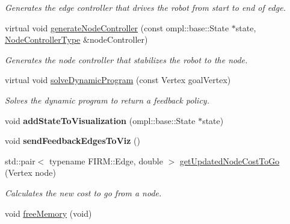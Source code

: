 \begin{DoxyCompactItemize}
\begin{DoxyCompactList}\small\item\em \-Generates the edge controller that drives the robot from start to end of edge. \end{DoxyCompactList}\item 
\hypertarget{class_f_i_r_m_ace29a4cc91f7232235931fa4bded8809}{virtual void \hyperlink{class_f_i_r_m_ace29a4cc91f7232235931fa4bded8809}{generate\-Node\-Controller} (const ompl\-::base\-::\-State $\ast$state, \hyperlink{class_controller}{\-Node\-Controller\-Type} \&node\-Controller)}\label{class_f_i_r_m_ace29a4cc91f7232235931fa4bded8809}

\begin{DoxyCompactList}\small\item\em \-Generates the node controller that stabilizes the robot to the node. \end{DoxyCompactList}\item 
\hypertarget{class_f_i_r_m_afe1c42e65c3382e1089324c1ab6306b6}{virtual void \hyperlink{class_f_i_r_m_afe1c42e65c3382e1089324c1ab6306b6}{solve\-Dynamic\-Program} (const \-Vertex goal\-Vertex)}\label{class_f_i_r_m_afe1c42e65c3382e1089324c1ab6306b6}

\begin{DoxyCompactList}\small\item\em \-Solves the dynamic program to return a feedback policy. \end{DoxyCompactList}\item 
\hypertarget{class_f_i_r_m_a4003d4144f6c32e9eaba79f292ec9ce4}{void {\bfseries add\-State\-To\-Visualization} (ompl\-::base\-::\-State $\ast$state)}\label{class_f_i_r_m_a4003d4144f6c32e9eaba79f292ec9ce4}

\item 
\hypertarget{class_f_i_r_m_a8d9e316c11b1e2ff52b5ff65996d3a01}{void {\bfseries send\-Feedback\-Edges\-To\-Viz} ()}\label{class_f_i_r_m_a8d9e316c11b1e2ff52b5ff65996d3a01}

\item 
\hypertarget{class_f_i_r_m_a63fbfe74dd4ac52c0cb0526ab9cf63bb}{std\-::pair$<$ typename \-F\-I\-R\-M\-::\-Edge, \*
double $>$ \hyperlink{class_f_i_r_m_a63fbfe74dd4ac52c0cb0526ab9cf63bb}{get\-Updated\-Node\-Cost\-To\-Go} (\-Vertex node)}\label{class_f_i_r_m_a63fbfe74dd4ac52c0cb0526ab9cf63bb}

\begin{DoxyCompactList}\small\item\em \-Calculates the new cost to go from a node. \end{DoxyCompactList}\item 
\hypertarget{class_f_i_r_m_af6951ffec04529fd8da990978d7d8d19}{void \hyperlink{class_f_i_r_m_af6951ffec04529fd8da990978d7d8d19}{free\-Memory} (void)}\label{class_f_i_r_m_af6951ffec04529fd8da990978d7d8d19}


\end{DoxyCompactItemize}
